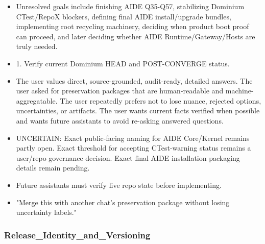 \documentclass[11pt,a4paper]{report}
\begin{document}
\begin{itemize}
\item Unresolved goals include finishing AIDE Q35-Q57, stabilizing Dominium CTest/RepoX blockers, defining final AIDE install/upgrade bundles, implementing root recycling machinery, deciding when product boot proof can proceed, and later deciding whether AIDE Runtime/Gateway/Hosts are truly needed.
\item 1. Verify current Dominium HEAD and POST-CONVERGE status.
\item The user values direct, source-grounded, audit-ready, detailed answers. The user asked for preservation packages that are human-readable and machine-aggregatable. The user repeatedly prefers not to lose nuance, rejected options, uncertainties, or artifacts. The user wants current facts verified when possible and wants future assistants to avoid re-asking answered questions.
\item UNCERTAIN: Exact public-facing naming for AIDE Core/Kernel remains partly open. Exact threshold for accepting CTest-warning status remains a user/repo governance decision. Exact final AIDE installation packaging details remain pending.
\item Future assistants must verify live repo state before implementing.
\item "Merge this with another chat's preservation package without losing uncertainty labels."
\end{itemize}

\subsubsection{Release\_Identity\_and\_Versioning}
\end{document}
